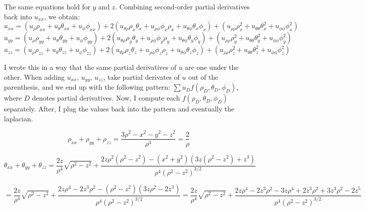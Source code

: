 \documentclass{article}
\begin{document}
The same equations hold for $y$ and $z$. Combining second-order partial derivatives back into $u_{xx}$, we obtain: 
\begin{equation*}
  u_{xx} = (u_\rho \rho_{xx} + u_\theta \theta_{xx} + u_\phi \phi_{xx}) + 2( u_{\theta \rho} \rho_x \theta_x + u_{\rho \phi} \phi_x \rho_x + u_{\theta \phi} \theta_x \phi_x) + (u_{\rho \rho} \rho_x^2 + u_{\theta \theta} \theta_x^2 + u_{\phi \phi} \phi_x^2)
\end{equation*}
\begin{equation*}
  u_{yy} = (u_\rho \rho_{yy} + u_\theta \theta_{yy} + u_\phi \phi_{yy}) + 2( u_{\theta \rho} \rho_y \theta_y + u_{\rho \phi} \phi_y \rho_y + u_{\theta \phi} \theta_y \phi_y) + (u_{\rho \rho} \rho_y^2 + u_{\theta \theta} \theta_y^2 + u_{\phi \phi} \phi_y^2)
\end{equation*}
\begin{equation*}
  u_{zz} = (u_\rho \rho_{zz} + u_\theta \theta_{zz} + u_\phi \phi_{zz}) + 2( u_{\theta \rho} \rho_z \theta_z + u_{\rho \phi} \phi_z \rho_z + u_{\theta \phi} \theta_z \phi_z) + (u_{\rho \rho} \rho_z^2 + u_{\theta \theta} \theta_z^2 + u_{\phi \phi} \phi_z^2)
\end{equation*}

I wrote this in a way that the same partial derivatives of $u$ are one under the other. When adding $u_{xx}$, $u_{yy}$, $u_{zz}$, take partial derivates of $u$ out of the parenthesis, and we end up with the following pattern: $\sum u_{D} f(\rho_{D}, \theta_D,\phi_D)$, where $D$ denotes partial derivatives. Now, I compute each $f(\rho_D, \theta_D, \phi_D)$ separately. After, I plug the values back into the pattern and eventually the laplacian.

\begin{equation*}
  \rho_{xx} + \rho_{yy} + \rho_{zz} = \frac{3\rho^2 - x^2 - y^2 - z^2}{\rho^3} = \frac{2}{\rho}
\end{equation*}

\begin{equation*}
  \theta_{xx} + \theta_{yy} + \theta_{zz} = \frac{2z}{\rho^4} \sqrt{\rho^2 - z^2} + \frac{2z\rho^2(\rho^2 - z^2) - (x^2 + y^2)(3z(\rho^2 - z^2) + z^3)}{\rho^4 (\rho^2 - z^2)^{3/2}}
\end{equation*}

\begin{equation*}
  = \frac{2z}{\rho^4} \sqrt{\rho^2 - z^2} + \frac{2z\rho^4 - 2z^3\rho^2 - (\rho^2 - z^2)(3z\rho^2 - 2z^3)}{\rho^4 (\rho^2 - z^2)^{3/2}} = \frac{2z}{\rho^4} \sqrt{\rho^2 - z^2} + \frac{2z\rho^4 - 2z^3 \rho^2 - 3z\rho^4 + 2z^3\rho^2 + 3z^3\rho^2 - 2z^5}{\rho^4 (\rho^2 - z^2)^{3/2}}
\end{equation*}
\end{document}
